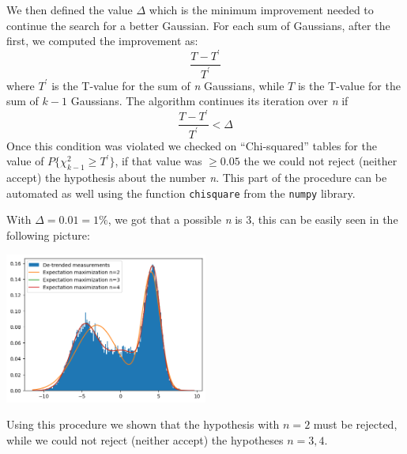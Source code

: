 \documentclass[10pt,a4paper]{article}
\begin{document}
We then defined the value \(\Delta\) which is the minimum improvement needed to continue the search for a better Gaussian. For each sum of Gaussians, after the first, we computed the improvement as: \[\frac{T - T^\prime}{T^\prime}\] where \(T^{\prime}\) is the T-value for the sum of \emph{n} Gaussians, while \(T\) is the T-value for the sum of \(k-1\) Gaussians. The algorithm continues its iteration over \emph{n} if \[\frac{T - T^\prime}{T^\prime} < \Delta\]%
Once this condition was violated we checked on ``Chi-squared'' tables for the value of \(P\{\chi^{2}_{k-1} \geq T^\prime\}\), if that value was \(\geq 0.05\) the we could not reject (neither accept) the hypothesis about the number \emph{n}. This part of the procedure can be automated as well using the function \texttt{chisquare} from the \texttt{numpy} library.

With \(\Delta = 0.01 = 1\%\), we got that a possible \emph{n} is 3, this can be easily seen in the following picture:

\begin{center}
  \includegraphics[width=0.5\textwidth]{point5.png}
\end{center}

Using this procedure we shown that the hypothesis with \(n = 2\) must be rejected, while we could not reject (neither accept) the hypotheses \(n = 3, 4\).
\end{document}
